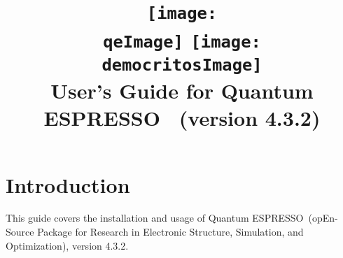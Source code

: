 \documentclass[12pt,a4paper]{article}
\def\version{4.3.2}
\def\qe{{\sc Quantum ESPRESSO}}
\begin{document}
 
\author{}
\date{}

\def\qeImage{quantum_espresso.pdf}
\def\democritosImage{democritos.pdf}

\begin{htmlonly}
\def\qeImage{quantum_espresso.png}
\def\democritosImage{democritos.png}
\end{htmlonly}

\title{
  \texttt{[image: \\qeImage]} \hskip 2cm
  \texttt{[image: \\democritosImage]}\\
  \vskip 1cm
  \Huge User's Guide for \qe\ \smallskip
  \Large (version \version)
}


\maketitle

\tableofcontents

\section{Introduction}

This guide covers the installation and usage of \qe\ (opEn-Source 
Package for Research in Electronic Structure, Simulation,
and Optimization), version \version.
\end{document}
